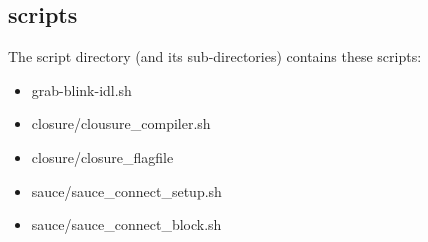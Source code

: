 \subsection{scripts}

The script directory (and its sub-directories) contains these scripts:

\begin{itemize}
  \item grab-blink-idl.sh
  \item closure/clousure\_compiler.sh
  \item closure/closure\_flagfile
  \item sauce/sauce\_connect\_setup.sh
  \item sauce/sauce\_connect\_block.sh
\end{itemize}

